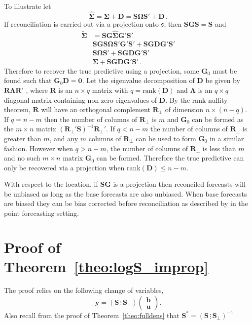 \documentclass[12pt]{article}
\theoremstyle{definition}
\begin{document}
To illustrate let
\[
\hat{\bm{\Sigma}}=\bm{\Sigma}+{\bm D}=\bm{S}\bm{\Omega}{\bm{S}}'+{\bm D}\,.
\]
If reconciliation is carried out via a projection onto $\mathfrak{s}$, then $\bm{S}\bm{G}\bm{S}=\bm{S}$ and
\begin{align}
\tilde{\bm{\Sigma}}&=\bm{S}\bm{G}\hat{\bm{\Sigma}}\bm{G}'\bm{S}'\nonumber\\
&\bm{S}\bm{G}\bm{S}\bm{\Omega}\bm{S}'\bm{G}'{\bm{S}}'+\bm{S}\bm{G}{\bm D}\bm{G}'\bm{S}'\nonumber\\
&\bm{S}\bm{\Omega}{\bm{S}}'+\bm{S}\bm{G}{\bm D}\bm{G}'\bm{S}'\nonumber\\
&\bm{\Sigma}+\bm{S}\bm{G}{\bm D}\bm{G}'\bm{S}'\nonumber\,.
\end{align}
Therefore to recover the true predictive using a projection, some ${\bm G}_0$ must be found such that ${\bm G}_0{\bm D}=\bm{0}$. Let the eigenvalue decomposition of $\bm {D}$ be given by  ${\bm R}{\bm \Lambda}{\bm R}'$ , where ${\bm R}$ is an $n\times q$ matrix with $q=\textrm{rank}({\bm{D}})$ and ${\bm\Lambda}$ is an $q\times q$ diagonal matrix containing non-zero eigenvalues of ${\bm D}$.  By the rank nullity theorem, $\bm{R}$ will have an orthogonal complement $\bm{R}_{\perp}$ of dimension $n\times (n-q)$.  If $q=n-m$ then the number of columns of $\bm{R}_{\perp}$ is $m$ and ${\bm G}_0$ can be formed as the $m\times n$ matrix $(\bm{R}_{\perp}'\bm{S})^{-1}\bm{R}_{\perp}'$.  If $q<n-m$ the number of columns of $\bm{R}_{\perp}$ is greater than $m$, and any $m$ columns of $\bm{R}_{\perp}$ can be used to form ${\bm G}_0$ in a similar fashion.  However when $q>n-m$, the number of columns of $\bm{R}_{\perp}$ is less than $m$ and no such $m\times n$ matrix ${\bm G}_0$ can be formed.  Therefore the true predictive can only be recovered via a projection when $\textrm{rank}({\bm D})\leq n-m$.

With respect to the location, if $\bm{SG}$ is a projection then reconciled forecasts will be unbiased as long as the base forecasts are also unbiased.  When base forecasts are biased they can be bias corrected before reconciliation as described by \cite{PanEtAl2019HF} in the point forecasting setting.

\clearpage
\section{Proof of Theorem~\ref{theo:logS_improp}}\label{app:logS_improp}

The proof relies on the following change of variables,
\[
\bm{y}=\left(\bm{S}\,\vdots\,\bm{S_\perp}\right)\begin{pmatrix}\bm{b}\\\bm{u}\end{pmatrix}.
\]
Also recall from the proof of Theorem~\ref{theo:fulldens} that $\bm{S}^*=\left(\bm{S}\,\vdots\,\bm{S_\perp}\right)^{-1}$
\end{document}
